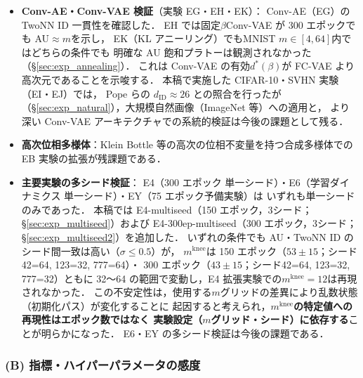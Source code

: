 \documentclass[11pt,a4paper]{jsarticle}
\newcommand{\mknee}{m^{\mathrm{knee}}}
\begin{document}
\begin{itemize}
  \item \textbf{Conv-AE・Conv-VAE 検証}（実験 EG・EH・EK）：
        Conv-AE（EG）の TwoNN ID 一貫性を確認した．
        EH では固定$\beta$Conv-VAE が 300 エポックでも AU$\approx m$を示し，
        EK（KL アニーリング）でもMNIST $m\in[4,64]$内ではどちらの条件でも
        明確な AU 飽和プラトーは観測されなかった（§\ref{sec:exp_annealing}）．
        これは Conv-VAE の有効$d^*(\beta)$が FC-VAE より高次元であることを示唆する．
        本稿で実施した CIFAR-10・SVHN 実験（EI・EJ）では，
        Pope ら\cite{pope2021intrinsic}の $d_\mathrm{ID} \approx 26$ との照合を行ったが
        （§\ref{sec:exp_natural}），大規模自然画像（ImageNet 等）への適用と，
        より深い Conv-VAE アーキテクチャでの系統的検証は今後の課題として残る．
  \item \textbf{高次位相多様体}：Klein Bottle 等の高次の位相不変量を持つ合成多様体での
        EB 実験の拡張が残課題である．
  \item \textbf{主要実験の多シード検証}：
        E4（300 エポック 単一シード）・E6（学習ダイナミクス 単一シード）・EY（75 エポック予備実験）は
        いずれも単一シードのみであった．
        本稿では E4-multiseed（150 エポック，3シード；§\ref{sec:exp_multiseed}）および
        E4-300ep-multiseed（300 エポック，3シード；§\ref{sec:exp_multiseed2}）を追加した．
        いずれの条件でも AU・TwoNN ID のシード間一致は高い（$\sigma \leq 0.5$）が，
        $\mknee$は 150 エポック（$53 \pm 15$；シード42=64, 123=32, 777=64）・
        300 エポック（$43 \pm 15$；シード42=64, 123=32, 777=32）ともに
        32〜64 の範囲で変動し，E4 拡張実験での$\mknee = 12$は再現されなかった．
        この不安定性は，使用する$m$グリッドの差異により乱数状態（初期化パス）が変化することに
        起因すると考えられ，\textbf{$\mknee$の特定値への再現性はエポック数ではなく
        実験設定（$m$グリッド・シード）に依存する}ことが明らかになった．
        E6・EY の多シード検証は今後の課題である．
\end{itemize}

\subsubsection*{(B) 指標・ハイパーパラメータの感度}
\end{document}
